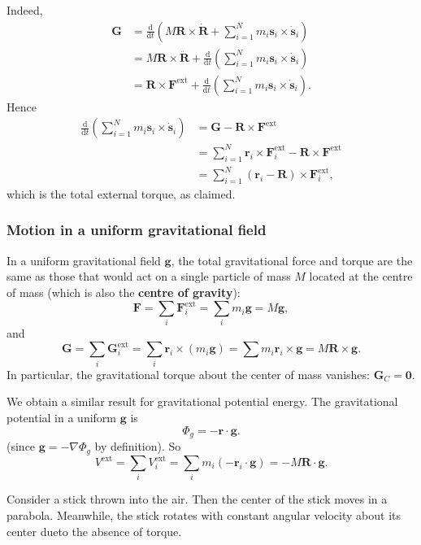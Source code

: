 Indeed, 
\begin{align*}
  \mathbf{G}&=\frac{\mathrm{d}}{\mathrm{d}t}\left( M\mathbf{R}\times\dot{\mathbf{R}}+\sum_{i=1}^{N}m_i\mathbf{s}_i\times \dot{\mathbf{s}}_i \right)\\ 
  &= M\mathbf{R} \times \ddot{\mathbf{R}} + \frac{\mathrm{d}}{\mathrm{d}t}\left( \sum_{i=1}^{N}m_i\mathbf{s}_i\times \dot{\mathbf{s}}_i \right)\\ 
  &= \mathbf{R} \times \mathbf{F}^{\text{ext}} +\frac{\mathrm{d}}{\mathrm{d}t}\left( \sum_{i=1}^{N}m_i\mathbf{s}_i\times \dot{\mathbf{s}}_i \right). 
\end{align*}
Hence 
\begin{align*}
  \frac{\mathrm{d}}{\mathrm{d}t}\left( \sum_{i=1}^{N}m_i\mathbf{s}_i\times \dot{\mathbf{s}}_i \right)&= \mathbf{G}-\mathbf{R} \times \mathbf{F}^{\text{ext}}\\ 
  &= \sum_{i=1}^{N}\mathbf{r}_i \times \mathbf{F}_i^{\text{ext}} - \mathbf{R} \times \mathbf{F}^{\text{ext}}\\ 
  &= \sum_{i=1}^{N}(\mathbf{r}_i-\mathbf{R})\times \mathbf{F}_i^{\text{ext}},
\end{align*}
which is the total external torque, as claimed.

\subsubsection*{Motion in a uniform gravitational field}

In a uniform gravitational field $\mathbf{g}$, the total gravitational force and torque are the same as those that would act on a single particle of mass $M$ located at the centre of mass (which is also the \textbf{centre of gravity}):
\[
  \mathbf{F} = \sum_i \mathbf{F}_i^{\mathrm{ext}} = \sum_i m_i \mathbf{g} = M\mathbf{g},
\]
and 
\[
  \mathbf{G} = \sum_i \mathbf{G}_i^{\mathrm{ext}} = \sum_i \mathbf{r}_i \times (m_i \mathbf{g}) = \sum m_i \mathbf{r}_i \times \mathbf{g} = M\mathbf{R}\times \mathbf{g}.
\]
In particular, the gravitational torque about the center of mass vanishes: $\mathbf{G}_C = \mathbf{0}$.

We obtain a similar result for gravitational potential energy. The gravitational potential in a uniform $\mathbf{g}$ is
\[
  \Phi_g = -\mathbf{r}\cdot \mathbf{g}.
\]
(since $\mathbf{g} = -\nabla \Phi_g$ by definition). So
\[
  V^{\mathrm{ext}} = \sum_i V_i^{\mathrm{ext}}
  = \sum_i m_i (- \mathbf{r}_i \cdot \mathbf{g})
  = -M\mathbf{R}\cdot\mathbf{g} .
\]

\begin{example}
  Consider a stick thrown into the air. Then the center of the stick moves in a parabola. Meanwhile, the stick rotates with constant angular velocity about its center dueto the absence of torque.
\end{example}


